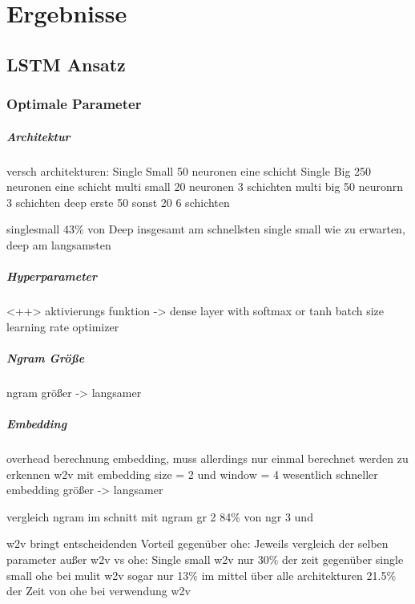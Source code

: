 
\chapter{Ergebnisse}
\label{ch:erg}
\section{LSTM Ansatz}
    \subsection{Optimale Parameter}

        \paragraph{Architektur}
            versch architekturen:
            Single Small 50 neuronen eine schicht
            Single Big 250 neuronen eine schicht
            multi small 20 neuronen 3 schichten
            multi big 50 neuronrn 3 schichten
            deep erste 50 sonst 20 6 schichten

            singlesmall 43\% von Deep
            insgesamt am schnellsten single small
            wie zu erwarten,  deep am langsamsten

        \paragraph{Hyperparameter}<++>
            aktivierungs funktion
            -> dense layer with softmax or tanh
            batch size
            learning rate
            optimizer

        \paragraph{Ngram Größe}
            ngram größer -> langsamer

        \paragraph{Embedding}

            overhead berechnung embedding, muss allerdings nur einmal berechnet werden
            zu erkennen w2v mit embedding size = 2  und window = 4 wesentlich schneller
            embedding größer -> langsamer

            vergleich ngram
            im schnitt mit ngram gr 2 84\% von ngr 3 und 

            w2v bringt entscheidenden Vorteil gegenüber ohe:
            Jeweils vergleich der selben parameter außer w2v vs ohe:
            Single small w2v nur 30\% der zeit gegenüber single small ohe
            bei mulit w2v sogar nur 13\%
            im mittel über alle architekturen 21.5\% der Zeit von ohe bei verwendung w2v

